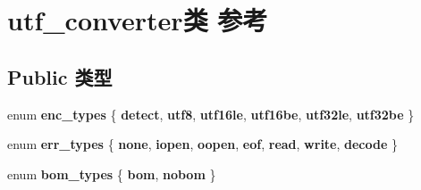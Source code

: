 \hypertarget{classutf__converter}{}\section{utf\+\_\+converter类 参考}
\label{classutf__converter}
\subsection*{Public 类型}
\begin{DoxyCompactItemize}
\item 
\mbox{\label{classutf__converter_ac573e63f01db39d5991b3fde2ff2dc8d}} 
enum {\bfseries enc\+\_\+types} \{ \newline
{\bfseries detect}, 
{\bfseries utf8}, 
{\bfseries utf16le}, 
{\bfseries utf16be}, 
\newline
{\bfseries utf32le}, 
{\bfseries utf32be}
 \}
\item 
\mbox{\label{classutf__converter_a9a17751acf7ecc7c13386c7e58ce1141}} 
enum {\bfseries err\+\_\+types} \{ \newline
{\bfseries none}, 
{\bfseries iopen}, 
{\bfseries oopen}, 
{\bfseries eof}, 
\newline
{\bfseries read}, 
{\bfseries write}, 
{\bfseries decode}
 \}
\item 
\mbox{\label{classutf__converter_a2574bd5cecb5b8a46e1bec330a349753}} 
enum {\bfseries bom\+\_\+types} \{ {\bfseries bom}, 
{\bfseries nobom}
 \}
\end{DoxyCompactItemize}

